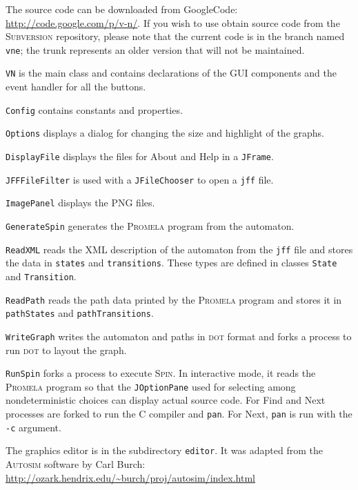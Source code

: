 \documentclass[11pt]{article}
\newcommand{\dt}{\textsc{dot}}
\newcommand{\spn}{\textsc{Spin}}
\newcommand{\prm}{\textsc{Promela}}
\newcommand{\p}[1]{\texttt{#1}}
\newcommand{\bu}[1]{\textsf{#1}}
\begin{document}
The source code can be downloaded from GoogleCode:
\url{http://code.google.com/p/v-n/}. If you wish to use obtain source
code from the \textsc{Subversion} repository, please note that the
current code is in the branch named \p{vne}; the trunk represents an
older version that will not be maintained.

\p{VN} is the main class and contains declarations
of the GUI components and the event handler for all the buttons.

\p{Config} contains constants and properties.

\p{Options} displays a dialog for changing the size and highlight of the
graphs.

\p{DisplayFile} displays the files for \bu{About} and \bu{Help}
in a \p{JFrame}.

\p{JFFFileFilter} is used with a \p{JFileChooser} to open a \p{jff} file.

\p{ImagePanel} displays the \textsc{PNG} files.

\p{GenerateSpin} generates the \prm{} program from the automaton.

\p{ReadXML} reads the XML description of the automaton from the \p{jff}
file and stores the data in \p{states} and \p{transitions}. These types
are defined in classes \p{State} and \p{Transition}.

\p{ReadPath} reads the path data printed by the \prm{} program and
stores it in \p{pathStates} and \p{pathTransitions}.

\p{WriteGraph} writes the automaton and paths in \dt{} format and forks
a process to run \dt{} to layout the graph.

\p{RunSpin} forks a process to execute \spn{}. In interactive mode, it
reads the \prm{} program so that the \p{JOptionPane} used for selecting
among nondeterministic choices can display actual source code. For
\bu{Find} and \bu{Next} processes are forked to run the C compiler and
\p{pan}. For \bu{Next}, \p{pan} is run with the \p{-c} argument.

The graphics editor is in the subdirectory \p{editor}. It was adapted
from the \textsc{Autosim} software by Carl Burch:
\url{http://ozark.hendrix.edu/~burch/proj/autosim/index.html}
\end{document}

